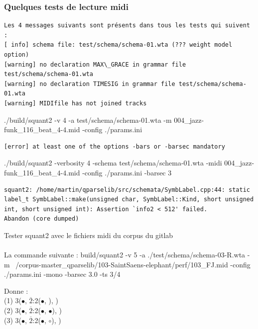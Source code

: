 \subsubsection{Quelques tests de lecture midi}
\begin{verbatim}
Les 4 messages suivants sont présents dans tous les tests qui suivent :
[ info] schema file: test/schema/schema-01.wta (??? weight model option)
[warning] no declaration MAX\_GRACE in grammar file test/schema/schema-01.wta
[warning] no declaration TIMESIG in grammar file test/schema/schema-01.wta
[warning] MIDIfile has not joined tracks
\end{verbatim}
./build/squant2 -v 4 -a test/schema/schema-01.wta -m 004\_jazz-funk\_116\_beat\_4-4.mid -config ./params.ini
\begin{verbatim}
[error] at least one of the options -bars or -barsec mandatory
\end{verbatim}
./build/squant2 -verbosity 4 -schema test/schema/schema-01.wta -midi 004\_jazz-funk\_116\_beat\_4-4.mid -config ./params.ini -barsec 3
\begin{verbatim}
squant2: /home/martin/qparselib/src/schemata/SymbLabel.cpp:44: static label_t SymbLabel::make(unsigned char, SymbLabel::Kind, short unsigned int, short unsigned int): Assertion `info2 < 512' failed.
Abandon (core dumped)
\end{verbatim}
Tester squant2 avec le fichiers midi du corpus du gitlab\\\\
La commande suivante :
build/squant2 -v 5 -a ./test/schema/schema-03-R.wta -m ~/corpus-master\_qparselib/103-SaintSaens-elephant/perf/103\_FJ.mid -config ./params.ini -mono -barsec 3.0 -ts 3/4	

Donne :\\
(1) 3($\bullet$, $\overline{2}$:2($\bullet$, ), )\\
(2) 3($\bullet$, $\overline{2}$:2($\bullet$, $\bullet$), )\\
(3) 3($\bullet$, $\overline{2}$:2($\bullet$, $\circ$), )\\\\


